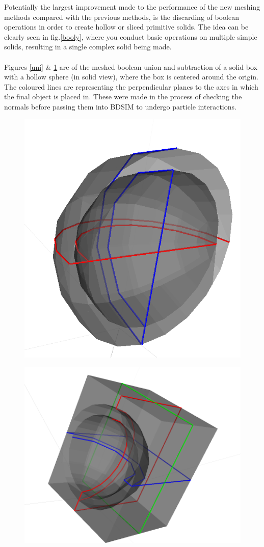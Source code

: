 \documentclass[12pt,a4paper]{article}
\begin{document}
\noindent Potentially the largest improvement made to the performance of the new meshing methods compared with the previous methods, is the discarding of boolean operations in order to create hollow or sliced primitive solids. The idea can be clearly seen in fig.\ref{booly}, where you conduct basic operations on multiple simple solids, resulting in a single complex solid being made.
\\\\
\noindent Figures \ref{uni} \& \ref{sub} are of the meshed boolean union and subtraction of a solid box with a hollow sphere (in solid view), where the box is centered around the origin. The coloured lines are representing the perpendicular planes to the axes in which the final object is placed in. These were made in the process of checking the normals before passing them into BDSIM to undergo particle interactions.
\\
\begin{figure}[h!]
\centering
\begin{minipage}{.4\textwidth}
  \centering
  \includegraphics[height=0.5\linewidth]{Images//Booleans/SphereUnion.png}
  \label{uni}
\end{minipage}%
\begin{minipage}{.4\textwidth}
  \centering
  \includegraphics[height=0.5\linewidth]{Images//Booleans//SphereSubtraction.png}
  \label{sub}
\end{minipage}%
\end{figure}
\end{document}
